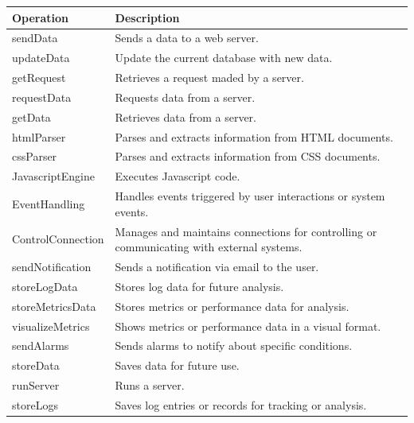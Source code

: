 \begin{center}
    \begin{table}[H]
        \begin{tabular}{| m{6cm}| m{8cm} |}
            \hline
            \textbf{Operation} & \textbf{Description} \\
            \hline
            sendData & Sends a data to a web server.\\
            \hline
            updateData & Update the current database with new data.\\
            \hline
            getRequest & Retrieves a request maded by a server.\\
            \hline
            requestData & Requests data from a server.\\
            \hline
            getData & Retrieves data from a server.\\
            \hline
            htmlParser & Parses and extracts information from HTML documents.\\
            \hline
            cssParser & Parses and extracts information from CSS documents.\\
            \hline
            JavascriptEngine & Executes Javascript code.\\
            \hline
            EventHandling & Handles events triggered by user interactions or system events.\\
            \hline
            ControlConnection & Manages and maintains connections for controlling or communicating with external systems.\\
            \hline
            sendNotification & Sends a notification via email to the user.\\
            \hline
            storeLogData & Stores log data for future analysis.\\
            \hline
            storeMetricsData & Stores metrics or performance data for analysis.\\
            \hline
            visualizeMetrics & Shows metrics or performance data in a visual format.\\
            \hline
            sendAlarms & Sends alarms to notify about specific conditions.\\
            \hline
            storeData & Saves data for future use.\\
            \hline
            runServer & Runs a server.\\
            \hline
            storeLogs & Saves log entries or records for tracking or analysis.\\

\end{tabular}
\end{table}
\end{center}
